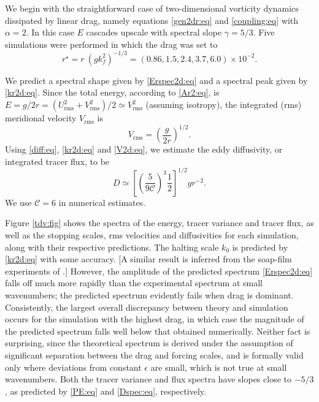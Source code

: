 \documentclass{jfm}
\newcommand{\ca}  [1]{\mathcal{#1}}
\newcommand{\rms} {\mathrm{rms}}
\begin{document}
We begin with the straightforward case of two-dimensional
vorticity dynamics dissipated by linear drag, namely equations
\eqref{gen2dr:eq} and \eqref{coupling:eq} with $\alpha=2$.  In
this case $E$ cascades upscale with spectral slope
$\gamma=5/3$.  Five simulations were performed in which the drag
was set to
\[
r^{\star} = r~\left(gk_f^2\right)^{-1/3}
=(0.86, 1.5, 2.4, 3.7, 6.0)\times 10^{-2}.
\]

We predict a spectral shape given by \eqref{Erspec2d:eq} and a
spectral peak given by \eqref{kr2d:eq}.  Since the total energy,
according to \eqref{Ar2:eq}, is
$E=g/2r=(U_{\rms}^2+V_{\rms}^2)/2\simeq V_{\rms}^2$ (assuming
isotropy), the integrated (rms) meridional velocity $V_{\rms}$ is
\begin{equation}
V_{\rms} = \left(\frac{g}{2r}\right)^{1/2}.
\label{V2d:eq}
\end{equation}
Using \eqref{diff:eq}, \eqref{kr2d:eq} and \eqref{V2d:eq}, we
estimate the eddy diffusivity, or integrated tracer flux, to be
\begin{equation}
D \simeq
\left[\left(\frac{5}{9\ca{C}}\right)^3\frac{1}{2}\right]^{1/2}gr^{-2}.
\label{diff2dr:eq}
\end{equation}
We use $\ca{C}=6$ in numerical estimates.

Figure \ref{tdv:fig} shows the spectra of the energy, tracer variance
and tracer flux, as well as the stopping scales, rms velocities and
diffusivities for each simulation, along with their respective
predictions.  The halting scale $k_0$ is predicted by \eqref{kr2d:eq}
with some accuracy.  [A similar result is inferred from the soap-film
experiments of \citet{Rivera00}.]  However, the amplitude of the
predicted spectrum \eqref{Erspec2d:eq} falls off much more rapidly
than the experimental spectrum at small wavenumbers; the predicted
spectrum evidently fails when drag is dominant.  Consistently, the
largest overall discrepancy between theory and simulation occurs for
the simulation with the highest drag, in which case the magnitude of
the predicted spectrum falls well below that obtained numerically.
Neither fact is surprising, since the theoretical spectrum is derived
under the assumption of significant separation between the drag and
forcing scales, and is formally valid only where deviations from
constant $\epsilon$ are small, which is not true at small wavenumbers.
Both the tracer variance and flux spectra have slopes close to $-5/3$,
as predicted by \eqref{PE:eq} and \eqref{Dspec:eq}, respectively.
\end{document}
